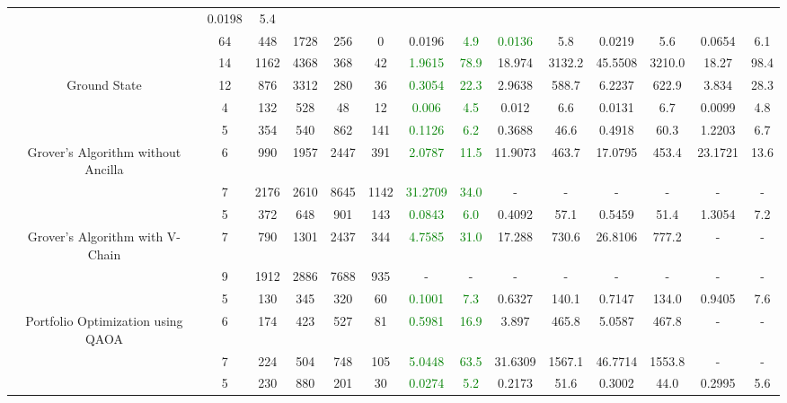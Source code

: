 \begin{table}[htb]
{\begin{tabular}{|c|c|c|c|c|c|c|c|c|c|c|c|c|c|}
 & 0.0198 & 5.4
 \\
 & 
64 & 448 & 1728 & 256 & 0
 & 0.0196 & \textcolor{green}{4.9}
 & \textcolor{green}{0.0136} & 5.8
 & 0.0219 & 5.6
 & 0.0654 & 6.1
 \\
\hline
 & 
14 & 1162 & 4368 & 368 & 42
 & \textcolor{green}{1.9615} & \textcolor{green}{78.9}
 & 18.974 & 3132.2
 & 45.5508 & 3210.0
 & 18.27 & 98.4
 \\
Ground State & 
12 & 876 & 3312 & 280 & 36
 & \textcolor{green}{0.3054} & \textcolor{green}{22.3}
 & 2.9638 & 588.7
 & 6.2237 & 622.9
 & 3.834 & 28.3
 \\
 & 
4 & 132 & 528 & 48 & 12
 & \textcolor{green}{0.006} & \textcolor{green}{4.5}
 & 0.012 & 6.6
 & 0.0131 & 6.7
 & 0.0099 & 4.8
 \\
\hline
 & 
5 & 354 & 540 & 862 & 141
 & \textcolor{green}{0.1126} & \textcolor{green}{6.2}
 & 0.3688 & 46.6
 & 0.4918 & 60.3
 & 1.2203 & 6.7
 \\
Grover's Algorithm without Ancilla & 
6 & 990 & 1957 & 2447 & 391
 & \textcolor{green}{2.0787} & \textcolor{green}{11.5}
 & 11.9073 & 463.7
 & 17.0795 & 453.4
 & 23.1721 & 13.6
 \\
 & 
7 & 2176 & 2610 & 8645 & 1142
 & \textcolor{green}{31.2709} & \textcolor{green}{34.0}
 & - & -
 & - & -
 & - & -
 \\
\hline
 & 
5 & 372 & 648 & 901 & 143
 & \textcolor{green}{0.0843} & \textcolor{green}{6.0}
 & 0.4092 & 57.1
 & 0.5459 & 51.4
 & 1.3054 & 7.2
 \\
Grover's Algorithm with V-Chain & 
7 & 790 & 1301 & 2437 & 344
 & \textcolor{green}{4.7585} & \textcolor{green}{31.0}
 & 17.288 & 730.6
 & 26.8106 & 777.2
 & - & -
 \\
 & 
9 & 1912 & 2886 & 7688 & 935
 & - & -
 & - & -
 & - & -
 & - & -
 \\
\hline
 & 
5 & 130 & 345 & 320 & 60
 & \textcolor{green}{0.1001} & \textcolor{green}{7.3}
 & 0.6327 & 140.1
 & 0.7147 & 134.0
 & 0.9405 & 7.6
 \\
Portfolio Optimization using QAOA & 
6 & 174 & 423 & 527 & 81
 & \textcolor{green}{0.5981} & \textcolor{green}{16.9}
 & 3.897 & 465.8
 & 5.0587 & 467.8
 & - & -
 \\
 & 
7 & 224 & 504 & 748 & 105
 & \textcolor{green}{5.0448} & \textcolor{green}{63.5}
 & 31.6309 & 1567.1
 & 46.7714 & 1553.8
 & - & -
 \\
\hline
 & 
5 & 230 & 880 & 201 & 30
 & \textcolor{green}{0.0274} & \textcolor{green}{5.2}
 & 0.2173 & 51.6
 & 0.3002 & 44.0
 & 0.2995 & 5.6
 \\

\end{tabular}}
\end{table}
